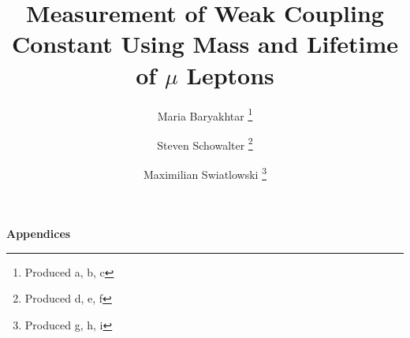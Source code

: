 \documentclass[psfig,12pt,notitlepage]{article}
\begin{document}
\title{Measurement of Weak Coupling Constant Using Mass and Lifetime of $\mu$ Leptons}
\author{Maria Baryakhtar \footnote{Produced a, b, c} \and Steven Schowalter \footnote{Produced d, e, f} \and Maximilian Swiatlowski \footnote{Produced g, h, i}}

\maketitle





\tableofcontents
\setcounter{tocdepth}{2}
\listoffigures


\clearpage












\newpage

\appendix

\begin{center}
\begin{Large}
\bfseries{Appendices}
\end{Large}
\end{center}





\end{document}

